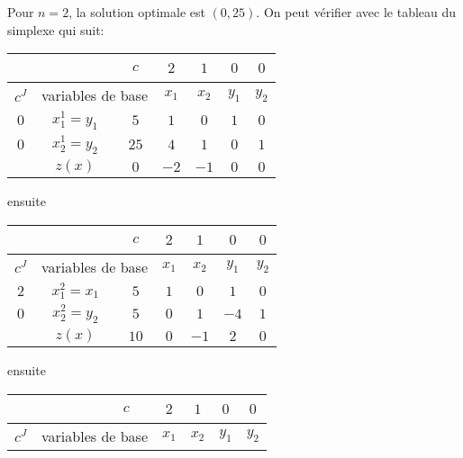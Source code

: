 {\begin{td-sol}[]
\begin{enumerate}
			Pour \(n=2\), la solution optimale est \((0, 25)\). On peut
			vérifier avec le tableau du simplexe qui suit:
			\begin{center}
				\begin{tabular}{|ccc|cccc|} %
					\hline  %
					& \ &\(c\)&\(2\)&\(1\)&\(0\)&\(0\)\\
					\hline %
					\multicolumn{1}{|c|}{\(c^J\)}& \multicolumn{2}{c|}{variables de base}&\(x_1\)&\(x_2\)&\(y_1\)&\(y_2\)\\
					\hline %
					\multicolumn{1}{|c|}{\(0\)}& \multicolumn{1}{c|}{\(x_1^{1}=y_1\)} &\(5\)&\(1\)&\(0\)&\(1\)&\(0\)\\
					\hline %
					\multicolumn{1}{|c|}{\(0\)}& \multicolumn{1}{c|}{\(x_2^{1}=y_2\)} &\(25\)&\(4\)&\(1\)&\(0\)&\(1\)\\
					\hline %
					\multicolumn{1}{|c|}{} &\(z(x)\)& \multicolumn{1}{|c|}{\(0\)} &\(-2\)&\(-1\)&\(0\)&\(0\)\\
					\hline %
				\end{tabular}
			\end{center}
			ensuite
			\begin{center}
				\begin{tabular}{|ccc|cccc|} %
					\hline  %
					& \ &\(c\)&\(2\)&\(1\)&\(0\)&\(0\)\\
					\hline %
					\multicolumn{1}{|c|}{\(c^J\)}& \multicolumn{2}{c|}{variables de base}&\(x_1\)&\(x_2\)&\(y_1\)&\(y_2\)\\
					\hline %
					\multicolumn{1}{|c|}{\(2\)}& \multicolumn{1}{c|}{\(x_1^{2}=x_1\)} &\(5\)&\(1\)&\(0\)&\(1\)&\(0\)\\
					\hline %
					\multicolumn{1}{|c|}{\(0\)}& \multicolumn{1}{c|}{\(x_2^{2}=y_2\)} &\(5\)&\(0\)&\(1\)&\(-4\)&\(1\)\\
					\hline %
					\multicolumn{1}{|c|}{} &\(z(x)\)& \multicolumn{1}{|c|}{\(10\)} &\(0\)&\(-1\)&\(2\)&\(0\)\\
					\hline %
				\end{tabular}
			\end{center}
			ensuite
			\begin{center}
				\begin{tabular}{|ccc|cccc|} %
					\hline  %
					& \ &\(c\)&\(2\)&\(1\)&\(0\)&\(0\)\\
					\hline %
					\multicolumn{1}{|c|}{\(c^J\)}& \multicolumn{2}{c|}{variables de base}&\(x_1\)&\(x_2\)&\(y_1\)&\(y_2\)\\

\end{tabular}
\end{center}
\end{enumerate}
\end{td-sol}}
